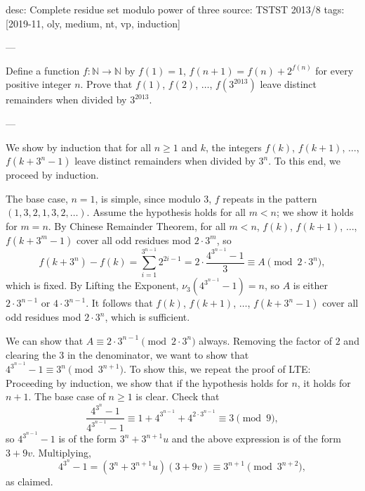 desc: Complete residue set modulo power of three
source: TSTST 2013/8
tags: [2019-11, oly, medium, nt, vp, induction]

---

Define a function $f:\mathbb N\to\mathbb N$ by $f(1)=1$, $f(n+1)=f(n)+2^{f(n)}$ for every positive integer $n$. Prove that $f(1)$, $f(2)$, $\ldots$, $f(3^{2013})$ leave distinct remainders when divided by $3^{2013}$.

---

We show by induction that for all $n\ge1$ and $k$, the integers $f(k)$, $f(k+1)$, $\ldots$, $f(k+3^n-1)$ leave distinct remainders when divided by $3^n$. To this end, we proceed by induction.

The base case, $n=1$, is simple, since modulo $3$, $f$ repeats in the pattern $(1,3,2,1,3,2,\ldots)$. Assume the hypothesis holds for all $m<n$; we show it holds for $m=n$. By Chinese Remainder Theorem, for all $m<n$, $f(k)$, $f(k+1)$, $\ldots$, $f(k+3^m-1)$ cover all odd residues mod $2\cdot3^m$, so \[f(k+3^n)-f(k)=\sum_{i=1}^{3^{n-1}}2^{2i-1}=2\cdot\frac{4^{3^{n-1}}-1}3\equiv A\pmod{2\cdot 3^n},\]
which is fixed. By Lifting the Exponent, $\nu_3(4^{3^{n-1}}-1)=n$, so $A$ is either $2\cdot3^{n-1}$ or $4\cdot3^{n-1}$. It follows that $f(k)$, $f(k+1)$, $\ldots$, $f(k+3^n-1)$ cover all odd residues mod $2\cdot3^n$, which is sufficient.
\begin{remark}
    We can show that $A\equiv2\cdot3^{n-1}\pmod{2\cdot3^n}$ always. Removing the factor of $2$ and clearing the $3$ in the denominator, we want to show that $4^{3^{n-1}}-1\equiv3^n\pmod{3^{n+1}}$. To show this, we repeat the proof of LTE: Proceeding by induction, we show that if the hypothesis holds for $n$, it holds for $n+1$. The base case of $n\ge1$ is clear. Check that \[\frac{4^{3^n}-1}{4^{3^{n-1}}-1}\equiv 1+4^{3^{n-1}}+4^{2\cdot3^{n-1}}\equiv3\pmod9,\]
    so $4^{3^{n-1}}-1$ is of the form $3^n+3^{n+1}u$ and the above expression is of the form $3+9v$. Multiplying, \[4^{3^n}-1=(3^n+3^{n+1}u)(3+9v)\equiv3^{n+1}\pmod{3^{n+2}},\]
    as claimed.
\end{remark}

